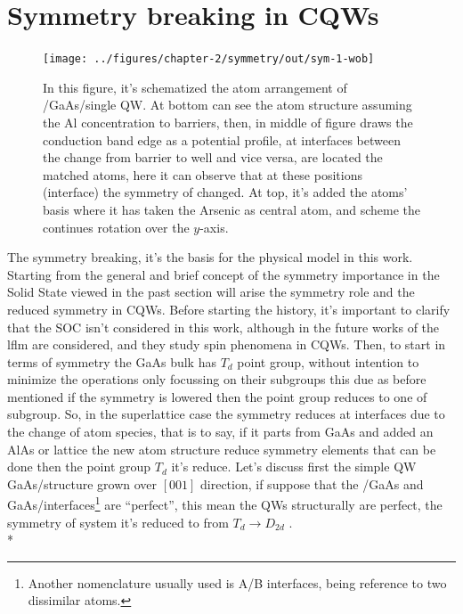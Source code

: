 \section{Symmetry breaking in CQWs}
\label{subsec:chapter-2-symmetry-breaking}
\vspace{-10mm}
\begin{figure}[H]
	\centering
		\texttt{[image: ../figures/chapter-2/symmetry/out/sym-1-wob]}
	\caption{In this figure, it's schematized the atom arrangement of \algaas/GaAs/\algaas single QW. At bottom can see the atom structure assuming the Al concentration to barriers, then, in middle of figure draws the conduction band edge as a potential profile, at interfaces between the change from barrier to well and vice versa,  are located the matched atoms, here it can observe that at these positions (interface) the symmetry of changed.  At top, it's added the atoms' basis where it has taken the Arsenic as central atom, and scheme the continues rotation over the $y$-axis. }
	\label{fig:subsubsection-2.2-qws-symmetry}
\end{figure}
The symmetry breaking, it's the basis for the physical model in this work. Starting from the general and brief concept of the symmetry importance in the Solid State viewed in the past section will arise the symmetry role and the reduced symmetry in CQWs. Before starting the history, it's important to clarify that the SOC isn't considered in this work, although in the future works of the \gls{lflm} are considered, and they study spin phenomena in CQWs. Then, to start in terms of symmetry the GaAs bulk has $T_{d}$ point group, without intention to minimize the operations only focussing on their subgroups this due as before mentioned if the symmetry is lowered then the point group reduces to one of subgroup\cite{dresselhaus2007group}. So, in the superlattice case the symmetry reduces at interfaces due to the change of atom species, that is to say, if it parts from GaAs and added an AlAs or \algaas lattice the new atom structure reduce symmetry elements that can be done then the point group $T_{d}$ it's reduce. 
Let's discuss first the simple QW GaAs/\algaas structure grown over $\left[001\right]$ direction, if suppose that the \algaas/GaAs and GaAs/\algaas interfaces\footnote{Another nomenclature usually used is A/B interfaces, being reference to two dissimilar atoms.} are ``perfect'', this mean the QWs structurally are perfect,  the symmetry of system it's reduced to from $T_{d}\to D_{2d}$ \cite{magri2000anticrossing,ivchenko1996heavylight}.  \\*
